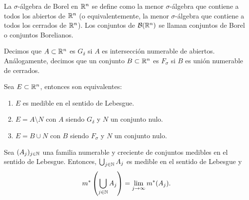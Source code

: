 \begin{definición} 
La $\sigma$-álgebra de Borel en $\mathbb{R}^n$ se define como la menor $\sigma$-álgebra que contiene a todos los abiertos de $\mathbb{R}^n$ (o equivalentemente, la menor $\sigma$-álgebra que contiene a todos los cerrados de $\mathbb{R}^n$). Los conjuntos de $\mathcal{B}(\mathbb{R}^n)$ se llaman conjuntos de Borel o conjuntos Borelianos.\\
\end{definición}

\begin{definición} 
Decimos que $A \subset \mathbb{R}^n$ es $G_\delta$ si $A$ es intersección numerable de abiertos. Análogamente, decimos que un conjunto $B \subset \mathbb{R}^n$ es $F_\sigma$ si $B$ es unión numerable de cerrados.
\end{definición}

\begin{corolario}
    Sea $E \subset \mathbb{R}^n$, entonces son equivalentes:
    \vspace{-0.5em}
    \begin{enumerate}
        \item $E$ es medible en el sentido de Lebesgue.
        \item $E = A \setminus N$ con $A$ siendo $G_\delta$ y $N$ un conjunto nulo.
        \item $E = B \cup N$ con $B$ siendo $F_\sigma$ y $N$ un conjunto nulo.
    \end{enumerate}
\end{corolario}

\begin{lema}
    Sea \((A_j)_{j \in \mathbb{N}}\) una familia numerable y creciente de conjuntos medibles en el sentido de Lebesgue. Entonces, \(\bigcup_{j \in \mathbb{N}} A_j\) es medible en el sentido de Lebesgue y
    \[
    m^*\left(\bigcup_{j \in \mathbb{N}} A_j\right) = \lim_{j \to \infty} m^*(A_j).
    \]
    \label{limUnionMedible}
\end{lema}


